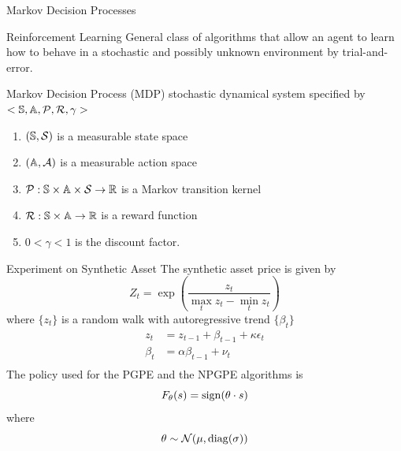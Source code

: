 \begin{frame}{Markov Decision Processes}
	\begin{block}{Reinforcement Learning}
		General class of algorithms that allow an agent to learn how to behave
		in a stochastic and possibly unknown environment by trial-and-error.
	\end{block}
	
	\begin{block}{Markov Decision Process (MDP)}
		stochastic dynamical system specified by $<\mathbb{S}, \mathbb{A}, \mathcal{P}, \mathcal{R}, \gamma>$
		\begin{enumerate}
			\item $(\mathbb{S}, \mathcal{S})$ is a measurable state space
			\item $(\mathbb{A}, \mathcal{A})$ is a measurable action space
			\item $\mathcal{P}: \mathbb{S} \times \mathbb{A} \times \mathcal{S} \to \mathbb{R}$ is a Markov transition kernel
			\item $\mathcal{R}: \mathbb{S} \times \mathbb{A} \to \mathbb{R}$ is a reward function
			\item $0 < \gamma < 1$ is the discount factor.
		\end{enumerate}
	\end{block}
\end{frame}


\begin{frame}{Experiment on Synthetic Asset}
	The synthetic asset price is given by
	\begin{equation*}
		Z_t = \exp\left(\frac{z_t}{\max_t z_t - \min_t z_t}\right)
	\end{equation*}
	where $\{z_t\}$ is a random walk with autoregressive trend $\{\beta_t\}$
		\begin{equation*}
			\begin{split}
				z_t &= z_{t-1} + \beta_{t-1} + \kappa \epsilon_t\\
				\beta_t &= \alpha \beta_{t-1} + \nu_t\\
			\end{split}
		\end{equation*}
	The policy used for the PGPE and the NPGPE algorithms is 
	\begin{equation*}
		F_\theta(s) = \operatorname{sign}(\theta \cdot s)
	\end{equation*}
	where
	\begin{equation*}
		\theta \sim \mathcal{N}(\mu, \operatorname{diag}(\sigma))
	\end{equation*}  
\end{frame}

